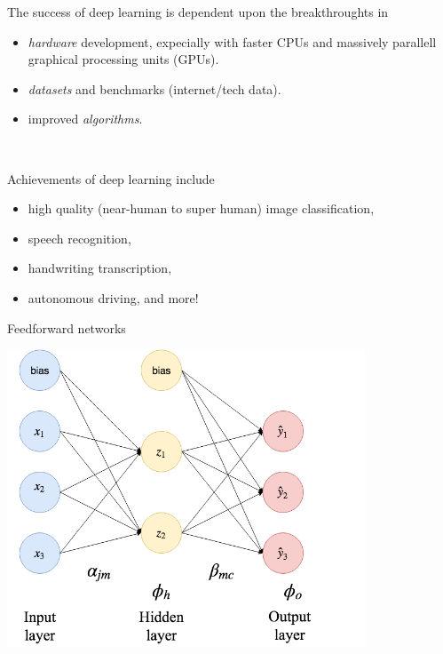 \documentclass[
  10pt,
  ignorenonframetext,
  twocolumn]{beamer}
\providecommand{\tightlist}{%
  \setlength{\itemsep}{0pt}\setlength{\parskip}{0pt}}
\begin{document}
\begin{frame}
The success of deep learning is dependent upon the breakthroughts in

\begin{itemize}
\tightlist
\item
  \emph{hardware} development, expecially with faster CPUs and massively
  parallell graphical processing units (GPUs).
\item
  \emph{datasets} and benchmarks (internet/tech data).
\item
  improved \emph{algorithms}.
\end{itemize}

\(~\)

Achievements of deep learning include

\begin{itemize}
\tightlist
\item
  high quality (near-human to super human) image classification,
\item
  speech recognition,
\item
  handwriting transcription,
\item
  autonomous driving, and more!
\end{itemize}
\end{frame}

\begin{frame}{Feedforward networks}
\label{feedforward-networks}
\centering

\includegraphics[width=0.8\textwidth,height=\textheight]{drawNNp3h2o3.png}
\end{frame}
\end{document}
